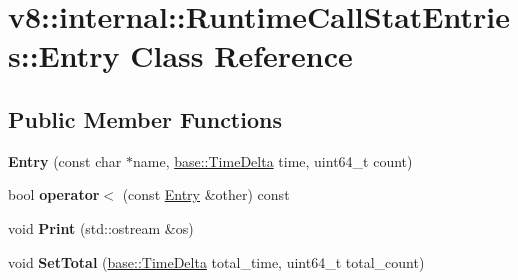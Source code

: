 \hypertarget{classv8_1_1internal_1_1_runtime_call_stat_entries_1_1_entry}{}\section{v8\+:\+:internal\+:\+:Runtime\+Call\+Stat\+Entries\+:\+:Entry Class Reference}
\label{classv8_1_1internal_1_1_runtime_call_stat_entries_1_1_entry}
\subsection*{Public Member Functions}
\begin{DoxyCompactItemize}
\item 
{\bfseries Entry} (const char $\ast$name, \hyperlink{classv8_1_1base_1_1_time_delta}{base\+::\+Time\+Delta} time, uint64\+\_\+t count)\hypertarget{classv8_1_1internal_1_1_runtime_call_stat_entries_1_1_entry_aeb266e95c5a69b6de8906e852e0b9757}{}\label{classv8_1_1internal_1_1_runtime_call_stat_entries_1_1_entry_aeb266e95c5a69b6de8906e852e0b9757}

\item 
bool {\bfseries operator$<$} (const \hyperlink{classv8_1_1internal_1_1_runtime_call_stat_entries_1_1_entry}{Entry} \&other) const \hypertarget{classv8_1_1internal_1_1_runtime_call_stat_entries_1_1_entry_a3d7363b0a81be3309a270a7a7ccd1a29}{}\label{classv8_1_1internal_1_1_runtime_call_stat_entries_1_1_entry_a3d7363b0a81be3309a270a7a7ccd1a29}

\item 
void {\bfseries Print} (std\+::ostream \&os)\hypertarget{classv8_1_1internal_1_1_runtime_call_stat_entries_1_1_entry_a1f7b4c2b9470f66346caa7a59c773a08}{}\label{classv8_1_1internal_1_1_runtime_call_stat_entries_1_1_entry_a1f7b4c2b9470f66346caa7a59c773a08}

\item 
void {\bfseries Set\+Total} (\hyperlink{classv8_1_1base_1_1_time_delta}{base\+::\+Time\+Delta} total\+\_\+time, uint64\+\_\+t total\+\_\+count)\hypertarget{classv8_1_1internal_1_1_runtime_call_stat_entries_1_1_entry_aed13b22749b682f6b3e730009391339d}{}\label{classv8_1_1internal_1_1_runtime_call_stat_entries_1_1_entry_aed13b22749b682f6b3e730009391339d}

\end{DoxyCompactItemize}
